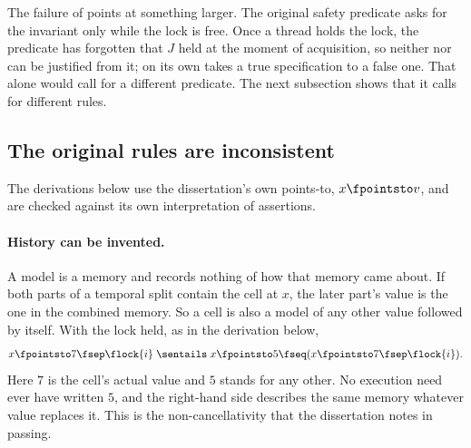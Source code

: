 The failure of  points at something larger. The original safety
predicate asks for the invariant only while the lock is free. Once a
thread holds the lock, the predicate has forgotten that $J$ held at the
moment of acquisition, so neither  nor  can be justified
from it;  on its own takes a true specification to a false one. That alone would call for a different predicate. The next
subsection shows that it calls for different rules.

\subsection{The original rules are inconsistent}
\label{sec:inconsistent}

The derivations below use the dissertation's own points-to, $x \fpointsto
v$, and are checked against its own interpretation of assertions.

\paragraph{History can be invented.}
A model is a memory and records nothing of how that memory came about. If
both parts of a temporal split contain the cell at $x$, the later part's
value is the one in the combined memory. So a cell is also a model of any
other value followed by itself. With the lock held, as in the derivation
below,
\begin{equation}
  \label{eq:invent}
  x \fpointsto 7 \fsep \flock{i}
  \;\sentails\;
  x \fpointsto 5 \fseq (x \fpointsto 7 \fsep \flock{i}).
\end{equation}
Here $7$ is the cell's actual value and $5$ stands for any other. No
execution need ever have written $5$, and the right-hand side describes
the same memory whatever value replaces it. This is the non-cancellativity
that the dissertation notes in passing.

